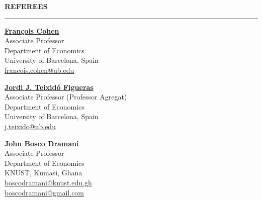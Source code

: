 \documentclass{resume} %
\def\sectionskip{\vspace{4pt}}
\def\sectionlineskip{\smallskip}
\renewenvironment{rSection}[1]{%
  \sectionskip
  \MakeUppercase{{\bf #1}}%
  \sectionlineskip
  \hrule
  \begin{list}{}{\setlength{\leftmargin}{0em}\setlength{\topsep}{5pt}\setlength{\itemsep}{0pt}\setlength{\parsep}{0pt}}%
  \item[]
}{%
  \end{list}
}
\begin{document}
\begin{rSection}{Referees}
\begin{minipage}[t]{0.32\textwidth}\raggedright
\href{https://sites.google.com/site/francoiscoheneconomist/home}{\textbf{François Cohen}}\\
Associate Professor\\
Department of Economics\\
University of Barcelona, Spain\\
\href{mailto:francois.cohen@ub.edu}{francois.cohen@ub.edu}
\end{minipage}\hfill
\begin{minipage}[t]{0.32\textwidth}\raggedright
\href{https://www.ub.edu/gim/members/jordi-teixido/}{\textbf{Jordi J. Teixidó Figueras}}\\
Associate Professor (Professor Agregat)\\
Department of Economics\\
University of Barcelona, Spain\\
\href{mailto:j.teixido@ub.edu}{j.teixido@ub.edu}
\end{minipage}\hfill
\begin{minipage}[t]{0.32\textwidth}\raggedright
\href{https://webapps.knust.edu.gh/staff/dirsearch/profile/summary/6d10a9a25ebf.html}{\textbf{John Bosco Dramani}}\\
Associate Professor\\
Department of Economics\\
KNUST, Kumasi, Ghana\\
\href{mailto:boscodramani@knust.edu.gh}{boscodramani@knust.edu.gh}\\
\href{mailto:boscodramani@gmail.com}{boscodramani@gmail.com}
\end{minipage}
\end{rSection}
\end{document}
